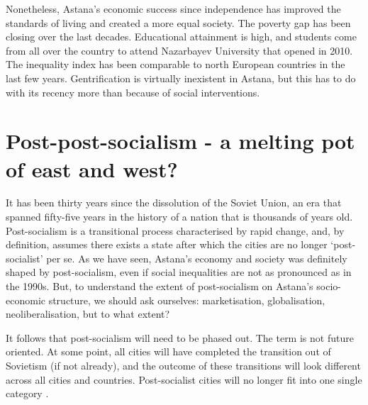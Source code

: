 \documentclass{article}
\begin{document}
Nonetheless, Astana's economic success since independence has improved the standards of living and created a more equal society. The poverty gap has been closing over the last decades. Educational attainment is high, and students come from all over the country to attend Nazarbayev University that opened in 2010. The inequality index has been comparable to north European countries in the last few years. Gentrification is virtually inexistent in Astana, but this has to do with its recency more than because of social interventions.

\section{Post-post-socialism - a melting pot of east and west?}



It has been thirty years since the dissolution of the Soviet Union, an era that spanned fifty-five years in the history of a nation that is thousands of years old. Post-socialism is a transitional process characterised by rapid change, and, by definition, assumes there exists a state after which the cities are no longer `post-socialist' per se. 
As we have seen, Astana's economy and society was definitely shaped by post-socialism, even if social inequalities are not as pronounced as in the 1990s. But, to understand the extent of post-socialism on Astana's socio-economic structure, we should ask ourselves: marketisation, globalisation, neoliberalisation, but to what extent?

It follows that post-socialism will need to be phased out. The term is not future oriented. At some point, all cities will have completed the transition out of Sovietism (if not already), and the outcome of these transitions will look different across all cities and countries. Post-socialist cities will no longer fit into one single category \parencite{hirt2016conceptual}.
\end{document}

